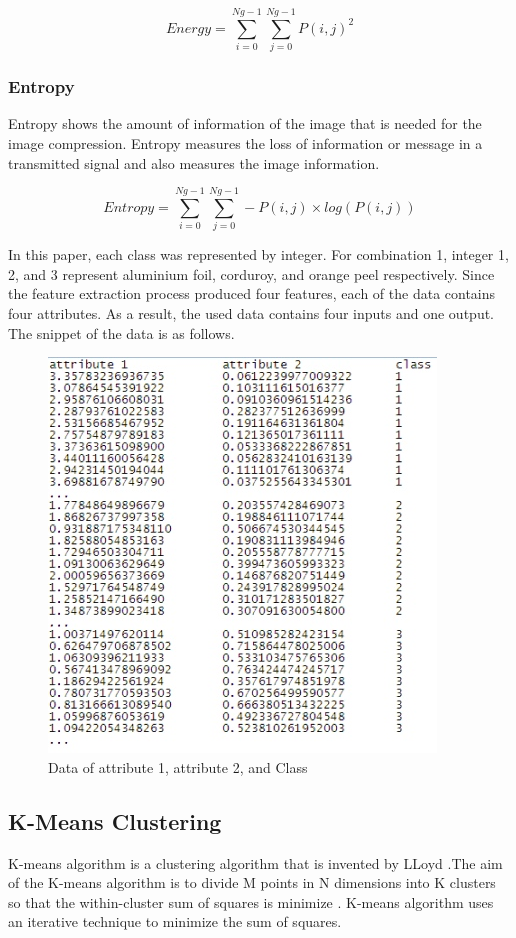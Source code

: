\documentclass[conference]{IEEEtran}
\begin{document}
\begin{equation}
Energy = \sum_{i=0}^{Ng-1}\sum_{j=0}^{Ng-1}P(i,j)^2
\end{equation}

\subsubsection{Entropy}
Entropy shows the amount of information of the image that is needed for the image compression. Entropy measures the loss of information or message in a transmitted signal and also measures the image information. 

\begin{equation}
Entropy = \sum_{i=0}^{Ng-1}\sum_{j=0}^{Ng-1}-P(i,j)\times log(P(i,j))
\end{equation}

In this paper, each class was represented by integer. For combination 1, integer 1, 2, and 3 represent aluminium foil, corduroy, and orange peel respectively. Since the feature extraction process produced four features, each of the data contains four attributes. As a result, the used data contains four inputs and one output. The snippet of the data is as follows. 

\begin{figure}[!t]
\centering
\includegraphics[width=2.3 in]{data_in.jpg}
\caption{Data of attribute 1, attribute 2, and Class}
\label{fig:data_feature_class}
\end{figure}



\subsection{K-Means Clustering}
K-means algorithm is a clustering algorithm that is invented by LLoyd \cite{Lloyd1982}.The aim of the K-means algorithm is to divide M points in N dimensions into K clusters so that the within-cluster sum of squares is minimize \cite{Hartigan1979}. K-means algorithm uses an iterative technique to minimize the sum of squares.
\end{document}
